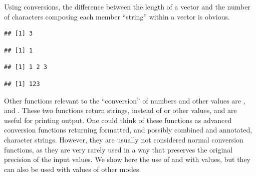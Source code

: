 \documentclass[krantz2]{krantz}\usepackage{knitr}
\begin{document}
\begin{explainbox}
Using conversions, the difference between the length of a  vector and the number of characters composing each member ``string'' within a vector is obvious.

\begin{knitrout}\footnotesize
{}\color{fgcolor}\begin{kframe}
\begin{alltt}
 \hlkwb{<-} \hlstd{(}\hlstd{,} \hlstd{,} \hlstd{)}
\end{alltt}
\begin{verbatim}
## [1] 3
\end{verbatim}
\begin{alltt}
 \hlkwb{<-} 
\end{alltt}
\begin{verbatim}
## [1] 1
\end{verbatim}
\begin{alltt}
\end{alltt}
\begin{verbatim}
## [1] 1 2 3
\end{verbatim}
\begin{alltt}
\end{alltt}
\begin{verbatim}
## [1] 123
\end{verbatim}
\end{kframe}
\end{knitrout}
\end{explainbox}

\sloppy
Other functions relevant to the ``conversion'' of numbers and other values are , and . These two functions return  strings, instead of  or other values, and are useful for printing output. One could think of these functions as advanced conversion functions returning formatted, and possibly combined and annotated, character strings. However, they are usually not considered normal conversion functions, as they are very rarely used in a way that preserves the original precision of the input values. We show here the use of  and  with  values, but they can also be used with values of other modes.
\end{document}
